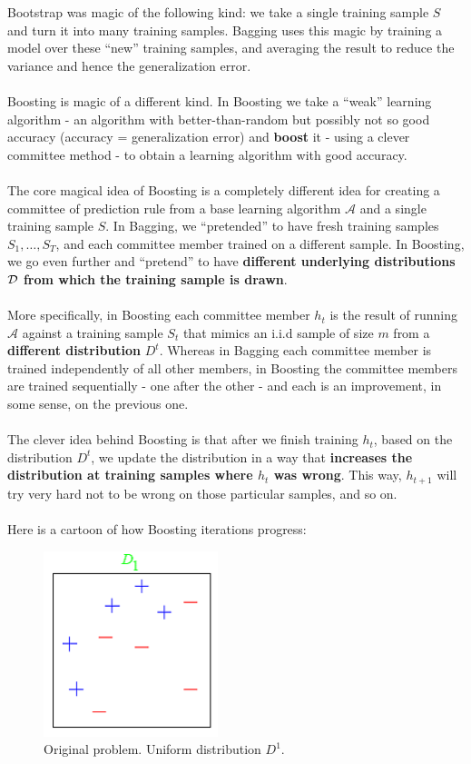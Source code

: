 \documentclass[11pt]{article}
\newcommand{\Ac}{\mathcal{A}}
\begin{document}
Bootstrap was magic of the following kind: we take a single
training sample $S$ and turn it into many training samples. Bagging uses this
magic by training a model over these ``new'' training samples, and averaging the
result to reduce the variance and hence the generalization error.
\\~\\
Boosting is magic of a different kind. In Boosting we take a ``weak'' learning
algorithm - an algorithm with better-than-random but possibly not so good accuracy (accuracy = generalization error) and {\bf
boost} it - using a clever committee method - to obtain a learning algorithm
with good accuracy. 
\\~\\
The core magical idea of Boosting is a completely different idea for creating a committee of prediction
rule from a base learning algorithm
$\Ac$ and a single training sample $S$. 
In Bagging, we ``pretended'' to have fresh training samples $S_1,\ldots,
S_T$, and each committee member trained on a different sample. In Boosting, we go
even further and ``pretend'' to have {\bf different underlying distributions $\mathcal{D}$
from which the training sample is drawn}.
\\~\\
More specifically, in Boosting each committee member $h_t$ is the result of
running $\Ac$ against a training sample $S_t$ that mimics an i.i.d sample of
size $m$ 
from a {\bf different distribution} $D^t$. Whereas in Bagging each committee
member is trained independently of all other members, in Boosting the committee
members are trained sequentially - one after the other - and each is an
improvement, in some sense, on the previous one. 
\\~\\
The clever idea behind Boosting is that after we finish training $h_t$, based on
the distribution $D^t$, 
we
update the distribution in a way that {\bf increases the distribution at training
samples where $h_t$ was wrong}. This way, $h_{t+1}$ will try very hard not to be
wrong on those particular samples, and so on. 
\\~\\
Here is a cartoon of how Boosting iterations progress:
\begin{figure}[H]
  \centering
  \includegraphics[width=2in]{boosting_toy0.png}
  \caption{Original problem. Uniform distribution $D^1$.}
\end{figure}
\end{document}
